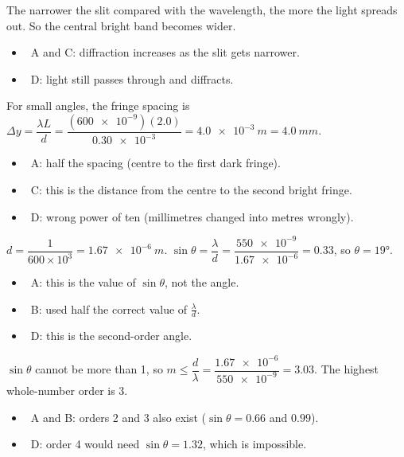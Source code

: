 \documentclass[12pt]{article}
\begin{document}
\begin{practiceanswers}
\begin{practiceans}
  The narrower the slit compared with the wavelength, the more the light spreads out. So the central
  bright band becomes wider.
  \begin{itemize}
    \item \xmark\ A and C: diffraction increases as the slit gets narrower.
    \item \xmark\ D: light still passes through and diffracts.
  \end{itemize}
\end{practiceans}

\begin{practiceans}
  For small angles, the fringe spacing is
  $\Delta y = \dfrac{\lambda L}{d} = \dfrac{(\num{600e-9})(2.0)}{\num{0.30e-3}} = \qty{4.0e-3}{m} = \qty{4.0}{mm}$.
  \begin{itemize}
    \item \xmark\ A: half the spacing (centre to the first dark fringe).
    \item \xmark\ C: this is the distance from the centre to the second bright fringe.
    \item \xmark\ D: wrong power of ten (millimetres changed into metres wrongly).
  \end{itemize}
\end{practiceans}

\begin{practiceans}
  $d = \dfrac{1}{600 \times 10^{3}} = \qty{1.67e-6}{m}$. \quad
  $\sin\theta = \dfrac{\lambda}{d} = \dfrac{\num{550e-9}}{\num{1.67e-6}} = 0.33$, so $\theta = \ang{19}$.
  \begin{itemize}
    \item \xmark\ A: this is the value of $\sin\theta$, not the angle.
    \item \xmark\ B: used half the correct value of $\frac{\lambda}{d}$.
    \item \xmark\ D: this is the second-order angle.
  \end{itemize}
\end{practiceans}

\begin{practiceans}
  $\sin\theta$ cannot be more than 1, so $m \le \dfrac{d}{\lambda} = \dfrac{\num{1.67e-6}}{\num{550e-9}} = 3.03$.
  The highest whole-number order is 3.
  \begin{itemize}
    \item \xmark\ A and B: orders 2 and 3 also exist ($\sin\theta = 0.66$ and $0.99$).
    \item \xmark\ D: order 4 would need $\sin\theta = 1.32$, which is impossible.
  \end{itemize}
\end{practiceans}


\end{practiceanswers}
\end{document}
